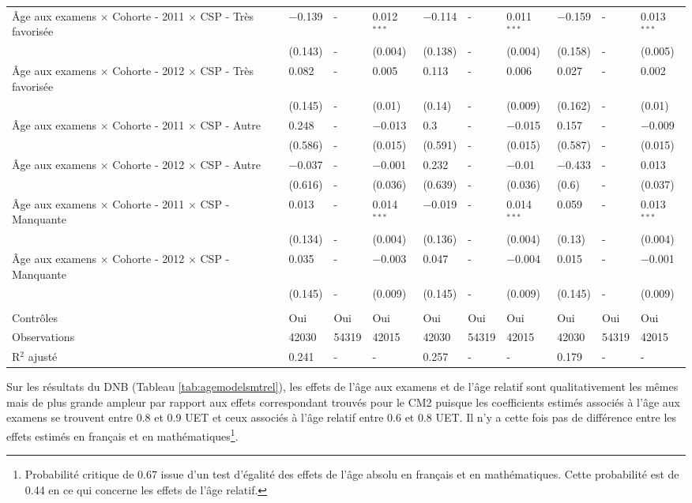 \documentclass[
]{book}
\begin{document}
\begin{landscape}
\begin{ThreePartTable}
\begin{longtable}[t]{llllllllll}
Âge aux examens $\times$ Cohorte - 2011 $\times$ CSP - Très favorisée & $-$0.139 & - & 0.012$^{***}$ & $-$0.114 & - & 0.011$^{***}$ & $-$0.159 & - & 0.013$^{***}$\\
 & (0.143) & - & (0.004) & (0.138) & - & (0.004) & (0.158) & - & (0.005)\\
Âge aux examens $\times$ Cohorte - 2012 $\times$ CSP - Très favorisée & 0.082 & - & 0.005 & 0.113 & - & 0.006 & 0.027 & - & 0.002\\
 & (0.145) & - & (0.01) & (0.14) & - & (0.009) & (0.162) & - & (0.01)\\
Âge aux examens $\times$ Cohorte - 2011 $\times$ CSP - Autre & 0.248 & - & $-$0.013 & 0.3 & - & $-$0.015 & 0.157 & - & $-$0.009\\
 & (0.586) & - & (0.015) & (0.591) & - & (0.015) & (0.587) & - & (0.015)\\
Âge aux examens $\times$ Cohorte - 2012 $\times$ CSP - Autre & $-$0.037 & - & $-$0.001 & 0.232 & - & $-$0.01 & $-$0.433 & - & 0.013\\
 & (0.616) & - & (0.036) & (0.639) & - & (0.036) & (0.6) & - & (0.037)\\
Âge aux examens $\times$ Cohorte - 2011 $\times$ CSP - Manquante & 0.013 & - & 0.014$^{***}$ & $-$0.019 & - & 0.014$^{***}$ & 0.059 & - & 0.013$^{***}$\\
 & (0.134) & - & (0.004) & (0.136) & - & (0.004) & (0.13) & - & (0.004)\\
Âge aux examens $\times$ Cohorte - 2012 $\times$ CSP - Manquante & 0.035 & - & $-$0.003 & 0.047 & - & $-$0.004 & 0.015 & - & $-$0.001\\
 & (0.145) & - & (0.009) & (0.145) & - & (0.009) & (0.145) & - & (0.009)\\
 &  &  &  &  &  &  &  &  & \\
Contrôles & Oui & Oui & Oui & Oui & Oui & Oui & Oui & Oui & Oui\\
Observations & 42030 & 54319 & 42015 & 42030 & 54319 & 42015 & 42030 & 54319 & 42015\\
R$^2$ ajusté & 0.241 & - & - & 0.257 & - & - & 0.179 & - & -\\*
\end{longtable}
\end{ThreePartTable}
\endgroup{}
\end{landscape}

\quad Sur les résultats du DNB (Tableau \ref{tab:agemodelsmtrel}), les effets de l'âge aux examens et de l'âge relatif sont qualitativement les mêmes mais de plus grande ampleur par rapport aux effets correspondant trouvés pour le CM2 puisque les coefficients estimés associés à l'âge aux examens se trouvent entre 0.8 et 0.9 UET et ceux associés à l'âge relatif entre 0.6 et 0.8 UET. Il n'y a cette fois pas de différence entre les effets estimés en français et en mathématiques\footnote{Probabilité critique de 0.67 issue d'un test d'égalité des effets de l'âge absolu en français et en mathématiques. Cette probabilité est de 0.44 en ce qui concerne les effets de l'âge relatif.}.
\end{document}
